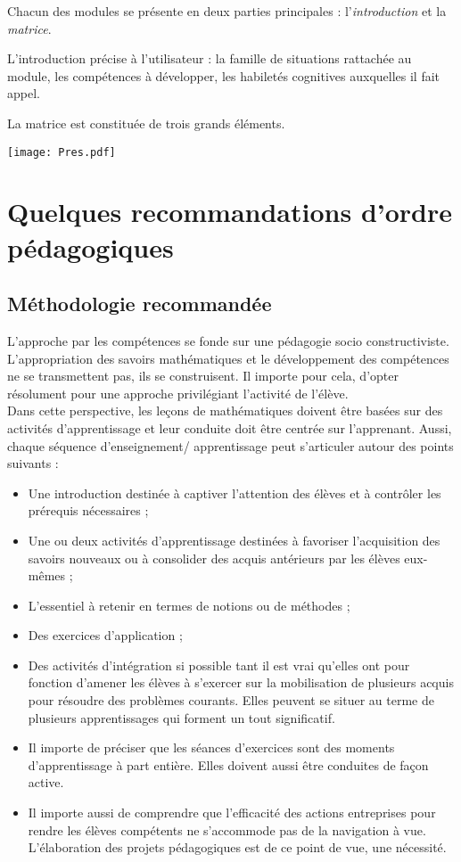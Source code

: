 Chacun des modules se présente en deux parties principales : l'\textit{introduction} et la \textit{matrice}.

L'introduction précise à l'utilisateur : la famille de situations rattachée au module, les compétences à développer, les habiletés cognitives auxquelles il fait appel.

La matrice est constituée de trois grands éléments.

\begin{center}
\texttt{[image: Pres.pdf]}
\end{center}

\section*{Quelques recommandations d'ordre pédagogiques}
\subsection*{Méthodologie recommandée}

L'approche par les compétences se fonde sur une pédagogie socio constructiviste. L'appropriation des savoirs mathématiques et le développement des compétences ne se transmettent pas, ils se construisent. Il importe pour cela, d'opter résolument pour une approche privilégiant l'activité de l'élève.\\
Dans cette perspective, les leçons de mathématiques doivent être basées sur des activités d'apprentissage et leur conduite doit être centrée sur l'apprenant. Aussi, chaque séquence d'enseignement/ apprentissage peut s'articuler autour des points suivants :
\begin{itemize}
\item Une introduction destinée à captiver l'attention des élèves et à contrôler les prérequis nécessaires ;
\item Une ou deux activités d'apprentissage destinées à favoriser l'acquisition des savoirs nouveaux ou à consolider des acquis antérieurs par les élèves eux-mêmes ;
\item L'essentiel à retenir en termes de notions ou de méthodes ;
\item Des exercices d'application ;
\item Des activités d'intégration si possible tant il est vrai qu'elles ont pour fonction d'amener les élèves à s'exercer sur la mobilisation de plusieurs acquis pour résoudre des problèmes courants. Elles peuvent se situer au terme de plusieurs apprentissages qui forment un tout significatif.
\item Il importe de préciser que les séances d'exercices sont des moments d'apprentissage à part entière. Elles doivent aussi être conduites de façon active.
\item Il importe aussi de comprendre que l'efficacité des actions entreprises pour rendre les élèves compétents ne s'accommode pas de la navigation à vue. L'élaboration des projets pédagogiques est de ce point de vue, une nécessité.
\end{itemize}

